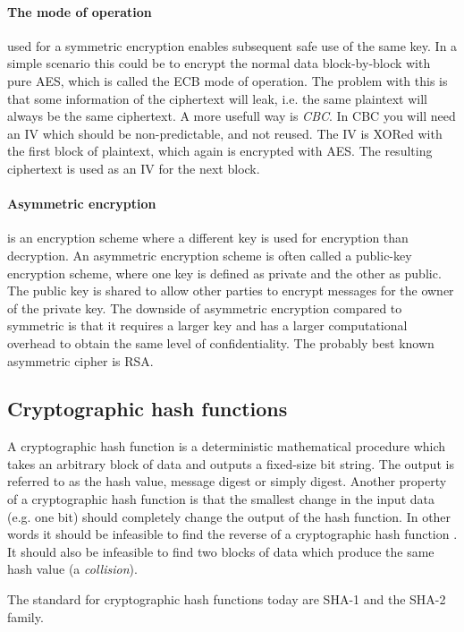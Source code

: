 \documentclass[pdftex,english,10pt,b5paper,twoside]{book}
\begin{document}
\paragraph{The mode of operation} used for a symmetric encryption enables
subsequent safe use of the same key. In a simple scenario this could be to
encrypt the normal data block-by-block with pure \ac{AES}, which is called the
\ac{ECB} mode of operation. The problem with this is that some information of
the ciphertext will leak, i.e. the same plaintext will always be the same
ciphertext. A more usefull way is \emph{\ac{CBC}}. In \ac{CBC} you will need an
\ac{IV} which should be non-predictable, and not reused. The \ac{IV} is XORed
with the first block of plaintext, which again is encrypted with \ac{AES}. The
resulting ciphertext is used as an \ac{IV} for the next block.

\paragraph{Asymmetric encryption} is an encryption scheme where a different key
is used for encryption than decryption\cite[p. 259]{stallings}. An asymmetric
encryption scheme is often called a public-key encryption scheme, where one key
is defined as private and the other as public. The public key is shared to
allow other parties to encrypt messages for the owner of the private key. The
downside of asymmetric encryption compared to symmetric is that it requires a
larger key and has a larger computational overhead to obtain the same level of
confidentiality. The probably best known asymmetric cipher is \ac{RSA}.

\subsection{Cryptographic hash functions}
A cryptographic hash function is a deterministic mathematical procedure which
takes an arbitrary block of data and outputs a fixed-size bit string. The output
is referred to as the hash value, message digest or simply digest.
Another property of a cryptographic hash function is that the smallest change in
the input data (e.g. one bit) should completely change the output of the hash
function. In other words it should be infeasible to find the reverse of a
cryptographic hash function \cite[p. 335]{stallings}. It should also be infeasible to
find two blocks of data which produce the same hash value (a \emph{collision}).

The standard for cryptographic hash functions today are \ac{SHA}-1 and the
\ac{SHA}-2 family.
\end{document}
